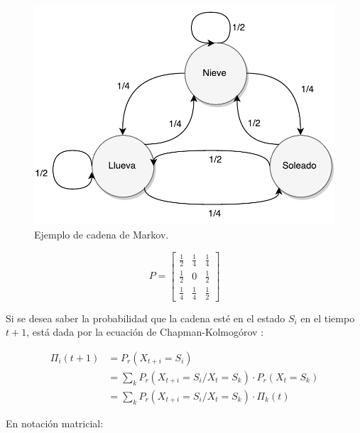 \begin{figure}
	\centering
	\includegraphics[scale=0.5]{images/EjCadenaMarkov.pdf}
	\caption{Ejemplo de cadena de Markov.}
	\label{fig:ejCadenaMarkov}
\end{figure}

\begin{equation} \label{eq:ejCadenaMarkov}
	P =
	\begin{bmatrix}
		\frac{1}{2} & \frac{1}{4} & \frac{1}{4} \\
		\frac{1}{2} & 0 & \frac{1}{2} \\
		\frac{1}{4} & \frac{1}{4} & \frac{1}{2}
	\end{bmatrix}	
\end{equation}

Si se desea saber la probabilidad que la cadena esté en el estado $S_i$ en el tiempo $t+1$, está dada por la ecuación de Chapman-Kolmogórov \citep{Papoulis1984}:

\begin{equation} \label{eq:chapman-kolmogorov1}
\begin{split}
	\Pi_{i} (t+1) &= P_r(X_{t+i}=S_i) \\
				  &= \sum _{k} P_r(X_{t+i} = S_i / X_t = S_k)·P_r(X_t = S_k)\\
				  &= \sum _{k} P_r(X_{t+i} = S_i / X_t = S_k)·\Pi_{k} (t)
\end{split}	
\end{equation}

En notación matricial:

